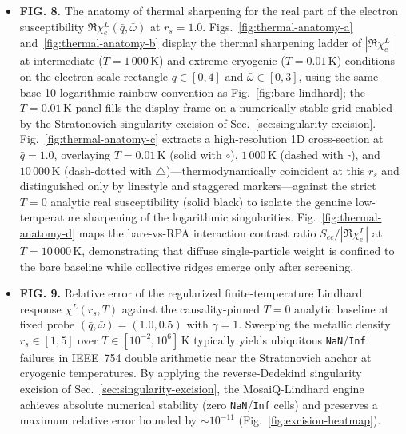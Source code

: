 \documentclass[aps,showkeys,noshowpacs,superscriptaddress,pre,preprint]{revtex4-2}
\begin{document}
\begin{itemize}
    \item \textbf{FIG. 8.} The anatomy of thermal sharpening for the real part of the electron susceptibility $\Re\chi_e^L(\bar{q}, \bar{\omega})$ at $r_s = 1.0$.
    Figs.~\ref{fig:thermal-anatomy-a} and~\ref{fig:thermal-anatomy-b} display the thermal sharpening ladder of $|\Re\chi_e^L|$ at intermediate ($T=1\,000\,\mathrm{K}$) and extreme cryogenic ($T=0.01\,\mathrm{K}$) conditions on the electron-scale rectangle $\bar{q}\in[0,4]$ and $\bar{\omega}\in[0,3]$, using the same base-10 logarithmic rainbow convention as Fig.~\ref{fig:bare-lindhard}; the $T=0.01\,\mathrm{K}$ panel fills the display frame on a numerically stable grid enabled by the Stratonovich singularity excision of Sec.~\ref{sec:singularity-excision}.
    Fig.~\ref{fig:thermal-anatomy-c} extracts a high-resolution 1D cross-section at $\bar{q}=1.0$, overlaying $T=0.01\,\mathrm{K}$ (solid with $\circ$), $1\,000\,\mathrm{K}$ (dashed with $\square$), and $10\,000\,\mathrm{K}$ (dash-dotted with $\triangle$)---thermodynamically coincident at this $r_s$ and distinguished only by linestyle and staggered markers---against the strict $T=0$ analytic real susceptibility (solid black) to isolate the genuine low-temperature sharpening of the logarithmic singularities.
    Fig.~\ref{fig:thermal-anatomy-d} maps the bare-vs-RPA interaction contrast ratio $S_{ee}/|\Re\chi_e^L|$ at $T=10\,000\,\mathrm{K}$, demonstrating that diffuse single-particle weight is confined to the bare baseline while collective ridges emerge only after screening.

    \item \textbf{FIG. 9.} Relative error of the regularized finite-temperature Lindhard response $\chi^L(r_s, T)$ against the causality-pinned $T=0$ analytic baseline at fixed probe $(\bar{q},\bar{\omega})=(1.0,0.5)$ with $\gamma=1$.
    Sweeping the metallic density $r_s \in [1, 5]$ over $T \in [10^{-2}, 10^{6}]\,\mathrm{K}$ typically yields ubiquitous \texttt{NaN}/\texttt{Inf} failures in IEEE~754 double arithmetic near the Stratonovich anchor at cryogenic temperatures.
    By applying the reverse-Dedekind singularity excision of Sec.~\ref{sec:singularity-excision}, the MosaiQ-Lindhard engine achieves absolute numerical stability (zero \texttt{NaN}/\texttt{Inf} cells) and preserves a maximum relative error bounded by $\sim 10^{-11}$ (Fig.~\ref{fig:excision-heatmap}).


\end{itemize}
\end{document}
